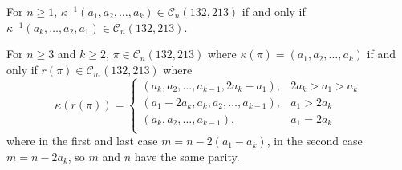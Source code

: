 \documentclass[10pt,a4paper]{amsart}
\newcommand\C{\mathcal C}
\begin{document}
\begin{proposition} \label{prop: reverse}
    For $n \geq 1$, $\kappa^{-1}(a_1,a_2,\dots,a_k) \in \C_n(132,213)$ if and only if $\kappa^{-1}(a_k,\dots,a_2,a_1) \in \C_n(132,213)$.
\end{proposition}

\begin{theorem} \label{thm: reduction}
    For $n \geq 3$ and $k \ge 2$, $\pi \in \C_{n}(132,213)$ where $\kappa(\pi) = (a_1,a_2,\dots,a_k)$ if and only if $r(\pi) \in \C_{m}(132,213)$ where 
    \[
    \kappa(r(\pi)) =
    \begin{cases}
        (a_k,a_2,\dots,a_{k-1},2a_k-a_1), & 2a_k > a_1 > a_k\\
        (a_1 - 2a_k, a_{k}, a_2,\dots,a_{k-1}), & a_1 > 2a_k\\
        (a_k,a_2,\dots,a_{k-1}), & a_1 = 2a_k\\
    \end{cases}
    \]
    where in the first and last case $m = n-2(a_1-a_k)$, in the second case $m = n-2a_k$, so $m$ and $n$ have the same parity.
\end{theorem}
\end{document}
